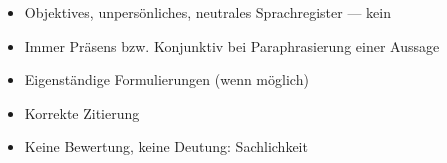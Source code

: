 
\begin{itemize}

	\item Objektives, unpers\"{o}nliches, neutrales Sprachregister --- kein 

	\item Immer Pr\"{a}sens bzw. Konjunktiv bei Paraphrasierung einer Aussage

	\item Eigenst\"{a}ndige Formulierungen (wenn m\"{o}glich) 

	\item Korrekte Zitierung

	\item Keine Bewertung, keine Deutung: Sachlichkeit

\end{itemize}

